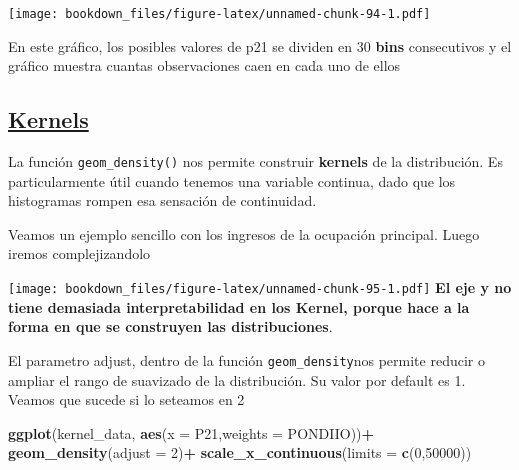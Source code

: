 \documentclass[]{book}
\newenvironment{Shaded}{\begin{snugshade}}{\end{snugshade}}
\newcommand{\DataTypeTok}[1]{\textcolor[rgb]{0.13,0.29,0.53}{#1}}
\newcommand{\DecValTok}[1]{\textcolor[rgb]{0.00,0.00,0.81}{#1}}
\newcommand{\KeywordTok}[1]{\textcolor[rgb]{0.13,0.29,0.53}{\textbf{#1}}}
\newcommand{\NormalTok}[1]{#1}
\newcommand{\OperatorTok}[1]{\textcolor[rgb]{0.81,0.36,0.00}{\textbf{#1}}}
\newcommand{\StringTok}[1]{\textcolor[rgb]{0.31,0.60,0.02}{#1}}
\begin{document}
\texttt{[image: bookdown\_files/figure-latex/unnamed-chunk-94-1.pdf]}

En este gráfico, los posibles valores de p21 se dividen en 30 \textbf{bins} consecutivos y el gráfico muestra cuantas observaciones caen en cada uno de ellos

\hypertarget{kernels}{%
\subsection{\texorpdfstring{\href{https://plot.ly/ggplot2/geom_density/}{Kernels}}{Kernels}}\label{kernels}}

La función \texttt{geom\_density()} nos permite construir \textbf{kernels} de la distribución. Es particularmente útil cuando tenemos una variable continua, dado que los histogramas rompen esa sensación de continuidad.

Veamos un ejemplo sencillo con los ingresos de la ocupación principal. Luego iremos complejizandolo

\begin{Shaded}
\end{Shaded}

\texttt{[image: bookdown\_files/figure-latex/unnamed-chunk-95-1.pdf]}
\textbf{El eje y no tiene demasiada interpretabilidad en los Kernel, porque hace a la forma en que se construyen las distribuciones}.

El parametro adjust, dentro de la función \texttt{geom\_density}nos permite reducir o ampliar el rango de suavizado de la distribución. Su valor por default es 1. Veamos que sucede si lo seteamos en 2

\begin{Shaded}
\begin{Highlighting}[]
\KeywordTok{ggplot}\NormalTok{(kernel_data, }\KeywordTok{aes}\NormalTok{(}\DataTypeTok{x =}\NormalTok{ P21,}\DataTypeTok{weights =}\NormalTok{ PONDIIO))}\OperatorTok{+}\StringTok{ }
\KeywordTok{geom_density}\NormalTok{(}\DataTypeTok{adjust =} \DecValTok{2}\NormalTok{)}\OperatorTok{+}
\KeywordTok{scale_x_continuous}\NormalTok{(}\DataTypeTok{limits =} \KeywordTok{c}\NormalTok{(}\DecValTok{0}\NormalTok{,}\DecValTok{50000}\NormalTok{))}
\end{Highlighting}
\end{Shaded}
\end{document}
